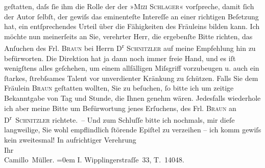 \begin{ledgroupsized}[t]{13cm}
               geſtatten, daſs ſie ihm die Rolle der der »\textsc{Mizi Schlager}« vorſpreche, damit ſich der Autor ſelbſt, der gewiſs das eminenteſte Intereſſe
               an einer richtigen Beſetzung hat, ein entſprechendes Urteil über die Fähigkeiten des
               Fräuleins bilden kann.\pend
           \pstart
           Ich möchte nun meinerſeits an Sie, verehrter Herr, die ergebenſte Bitte richten, das
                  {\pb}Anſuchen des Frl. \textsc{Braun} bei Herrn D\textsuperscript{r}{ }\textsc{Schnitzler} auf meine Empfehlung hin zu befürworten. Die
               Direktion hat ja dann noch immer freie Hand, und es iſt wenigſtens alles geſchehen,
               um einem allfälligen Miſsgriff vorzubeugen u. auch ein ſtarkes, ſtrebſsames Talent
               vor unverdienter Kränkung zu ſchützen.\pend
           \pstart
           Falls Sie dem Fräulein \textsc{Braun} geſtatten wollten, Sie zu beſuchen, ſo bitte ich um zeitige Bekanntgabe von Tag
               und Stunde, die Ihnen {\pb}genehm
               wären. Jedesfalls wiederhole ich aber meine Bitte um Befürwortung jenes Erſuchens,
               des Frl. \textsc{Braun} an D\textsuperscript{r} \textsc{Schnitzler}
               richtete. –\pend
           \pstart
           Und zum Schluſſe bitte ich nochmals, mir dieſe langweilige, Sie wohl empflindlich
               ſtörende Epiſtel zu verzeihen – ich komm gewiſs kein zweitesmal!\pend
           \pstart
           In aufrichtiger Verehrung{\\[\baselineskip]}Ihr{\\[\baselineskip]}\spacefill\mbox{Camillo Müller.}\pend
           \leftskip=0em{}\pstart
           \noindent{}I. Wipplingerstraſſe 33, T. 14048.\pend
           \pstart
           \label{T_L01796-1v}\label{T_L01796-1h}\pend
           
         
         \endnumbering{}\end{ledgroupsized}  \newcommand{\dateiname}{L01796}\newcommand{\titel}{Hugo und Gerty von Hofmannsthal an Arthur Schnitzler, 31. 10. 1908}\newcommand{\editorInnen}{Martin Anton Müller und Gerd-Hermann Susen}
      
